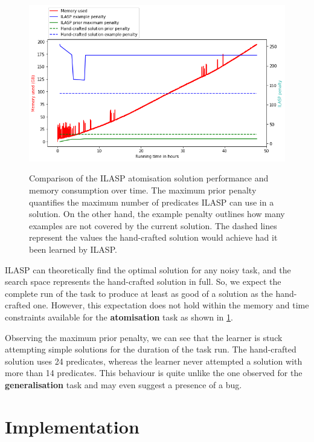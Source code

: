 \begin{figure}[h]
\caption{Comparison of the ILASP atomisation solution performance and memory consumption over time. The maximum prior penalty quantifies the maximum number of predicates ILASP can use in a solution. On the other hand, the example penalty outlines how many examples are not covered by the current solution. The dashed lines represent the values the hand-crafted solution would achieve had it been learned by ILASP.}
\centering
\includegraphics[width=\textwidth]{solving-nlp-tasks-logically/atomisation_memory_vs_best_score.png}
\label{atomisation-memory-graph}
\end{figure}

ILASP can theoretically find the optimal solution for any noisy task, and the search space represents the hand-crafted solution in full. 
So, we expect the complete run of the task to produce at least as good of a solution as the hand-crafted one.
However, this expectation does not hold within the memory and time constraints available for the \textbf{atomisation} task as shown in \ref{atomisation-memory-graph}.

Observing the maximum prior penalty, we can see that the learner is stuck attempting simple solutions for the duration of the task run. 
The hand-crafted solution uses 24 predicates, whereas the learner never attempted a solution with more than 14 predicates.
This behaviour is quite unlike the one observed for the \textbf{generalisation} task and may even suggest a presence of a bug.

\section{Implementation}


